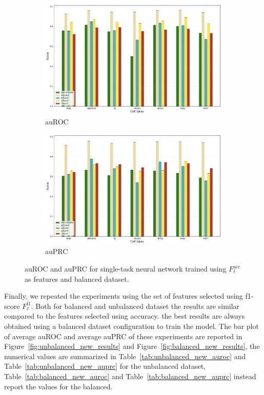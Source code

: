 \begin{figure}[!htbp]
    \centering
    \begin{subfigure}[b]{\textwidth}
        \includegraphics[width=\textwidth]{images/results_plots/single_tasks/balanced_old_auroc.png}
        \caption{auROC}
        \label{fig:auroc_balanced_old}
    \end{subfigure}
    \begin{subfigure}[b]{\textwidth}
        \includegraphics[width=\textwidth]{images/results_plots/single_tasks/balanced_old_auprc.png}
        \caption{auPRC}
        \label{fig:auprc_balanced_old}
    \end{subfigure}
    \caption{auROC and auPRC for single-task neural network trained using $F_\ell^{\textrm{acc}}$ as features and balanced dataset.}\label{fig:balanced_old_results}
\end{figure}

Finally, we repeated the experiments using the set of features selected using f1-score $F_\ell^{\textrm{f1}}$. Both for balanced and unbalanced dataset the results are similar compared to the features selected using accuracy. the best results are always obtained using a balanced dataset configuration to train the model. The bar plot of average auROC and average auPRC of these experiments are reported in Figure~\ref{fig:unbalanced_new_results} and Figure~\ref{fig:balanced_new_results}, the numerical values are summarized in Table~\ref{tab:unbalanced_new_auroc} and Table~\ref{tab:unbalanced_new_auprc} for the unbalanced dataset, Table~\ref{tab:balanced_new_auroc} and Table~\ref{tab:balanced_new_auprc} instead report the values for the balanced. 

